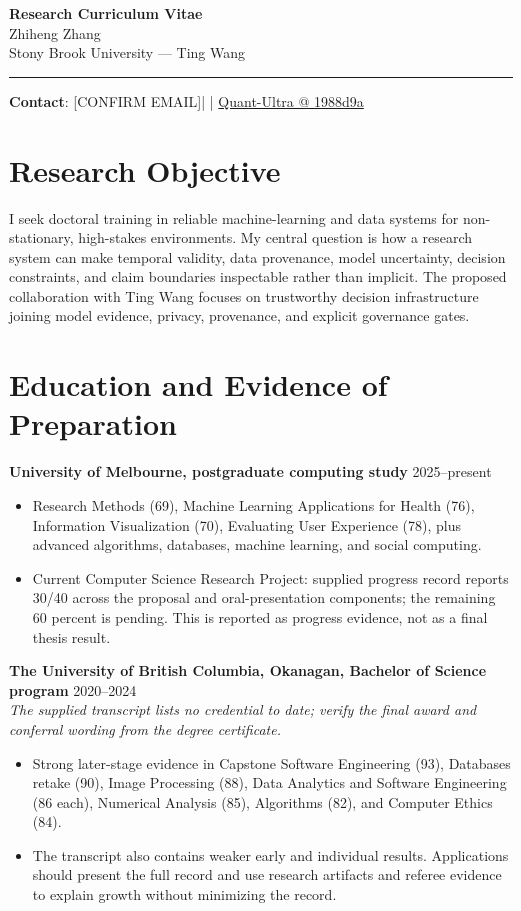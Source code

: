 \documentclass[11pt]{article}
\makeatletter
\newcommand{\ApplicantName}{Zhiheng Zhang}
\newcommand{\ApplicantEmail}{[CONFIRM EMAIL]}
\newcommand{\ApplicantPhone}{[CONFIRM PHONE]}
\newcommand{\ApplicantGitHub}{\href{https://github.com/zhiheng-zhang-Mera/Quant-Ultra/tree/1988d9a8530da91a8158de864d098ea869098923}{Quant-Ultra @ 1988d9a}}
\makeatother
\begin{document}
\begin{center}
{\LARGE\bfseries Research Curriculum Vitae}\\[0.25em]
{\large \ApplicantName}\\
Stony Brook University --- Ting Wang
\end{center}
\vspace{0.35em}\hrule\vspace{0.65em}

\textbf{Contact}: \ApplicantEmail\quad | \quad \ApplicantPhone\quad | \quad \ApplicantGitHub

\section*{Research Objective}
I seek doctoral training in reliable machine-learning and data systems for non-stationary, high-stakes environments. My central question is how a research system can make temporal validity, data provenance, model uncertainty, decision constraints, and claim boundaries inspectable rather than implicit. The proposed collaboration with Ting Wang focuses on trustworthy decision infrastructure joining model evidence, privacy, provenance, and explicit governance gates.

\section*{Education and Evidence of Preparation}
\textbf{University of Melbourne, postgraduate computing study} \hfill 2025--present
\begin{itemize}
\item Research Methods (69), Machine Learning Applications for Health (76), Information Visualization (70), Evaluating User Experience (78), plus advanced algorithms, databases, machine learning, and social computing.
\item Current Computer Science Research Project: supplied progress record reports 30/40 across the proposal and oral-presentation components; the remaining 60 percent is pending. This is reported as progress evidence, not as a final thesis result.
\end{itemize}

\textbf{The University of British Columbia, Okanagan, Bachelor of Science program} \hfill 2020--2024\\
\textit{The supplied transcript lists no credential to date; verify the final award and conferral wording from the degree certificate.}
\begin{itemize}
\item Strong later-stage evidence in Capstone Software Engineering (93), Databases retake (90), Image Processing (88), Data Analytics and Software Engineering (86 each), Numerical Analysis (85), Algorithms (82), and Computer Ethics (84).
\item The transcript also contains weaker early and individual results. Applications should present the full record and use research artifacts and referee evidence to explain growth without minimizing the record.
\end{itemize}
\end{document}
